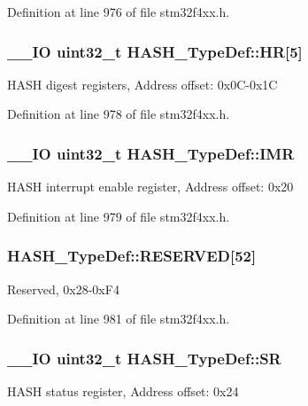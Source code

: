 Definition at line 976 of file stm32f4xx.\-h.

\hypertarget{struct_h_a_s_h___type_def_acb0d3ac4cdf8c478ca0ffeebadc04840}{
\subsubsection[{H\-R}]{\setlength{\rightskip}{0pt plus 5cm}\-\_\-\-\_\-\-I\-O {\bf uint32\-\_\-t} H\-A\-S\-H\-\_\-\-Type\-Def\-::\-H\-R\mbox{[}5\mbox{]}}}\label{struct_h_a_s_h___type_def_acb0d3ac4cdf8c478ca0ffeebadc04840}
H\-A\-S\-H digest registers, Address offset\-: 0x0\-C-\/0x1\-C 

Definition at line 978 of file stm32f4xx.\-h.

\hypertarget{struct_h_a_s_h___type_def_a01011d00eb28b8798af8c5dfedf6f35d}{
\subsubsection[{I\-M\-R}]{\setlength{\rightskip}{0pt plus 5cm}\-\_\-\-\_\-\-I\-O {\bf uint32\-\_\-t} H\-A\-S\-H\-\_\-\-Type\-Def\-::\-I\-M\-R}}\label{struct_h_a_s_h___type_def_a01011d00eb28b8798af8c5dfedf6f35d}
H\-A\-S\-H interrupt enable register, Address offset\-: 0x20 

Definition at line 979 of file stm32f4xx.\-h.

\hypertarget{struct_h_a_s_h___type_def_a9f95e7cb8f85cae58cc429e14e96f663}{
\subsubsection[{R\-E\-S\-E\-R\-V\-E\-D}]{ H\-A\-S\-H\-\_\-\-Type\-Def\-::\-R\-E\-S\-E\-R\-V\-E\-D\mbox{[}52\mbox{]}}}\label{struct_h_a_s_h___type_def_a9f95e7cb8f85cae58cc429e14e96f663}
Reserved, 0x28-\/0x\-F4 

Definition at line 981 of file stm32f4xx.\-h.

\hypertarget{struct_h_a_s_h___type_def_a8af8c27ac134cbeb13af4e4e856de537}{
\subsubsection[{S\-R}]{\setlength{\rightskip}{0pt plus 5cm}\-\_\-\-\_\-\-I\-O {\bf uint32\-\_\-t} H\-A\-S\-H\-\_\-\-Type\-Def\-::\-S\-R}}\label{struct_h_a_s_h___type_def_a8af8c27ac134cbeb13af4e4e856de537}
H\-A\-S\-H status register, Address offset\-: 0x24 

